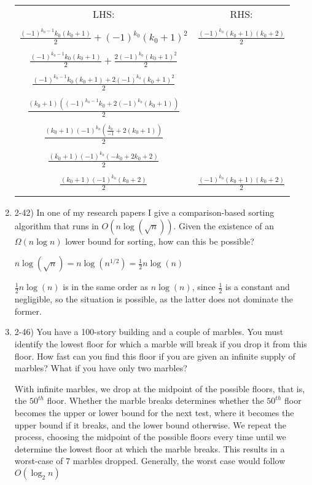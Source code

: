 \documentclass{article}
\begin{document}
\begin{enumerate}
    \begin{center}
        \begin{tabular}{ c | c } 
        LHS: & RHS: \\ \\
        $ \frac{(-1)^{k_0-1}k_0(k_0+1)}{2} + (-1)^{k_0}(k_0+1)^2 $ & $ \frac{(-1)^{k_0}(k_0+1)(k_0+2)}{2} $ \\ \\
        $ \frac{(-1)^{k_0-1}k_0(k_0+1)}{2} + \frac{2(-1)^{k_0}(k_0+1)^2}{2} $ &  \\ \\
        $ \frac{(-1)^{k_0-1}k_0(k_0+1) + 2(-1)^{k_0}(k_0+1)^2}{2}  $ &  \\ \\
        $ \frac{(k_0+1)((-1)^{k_0-1}k_0+2(-1)^{k_0}(k_0+1))}{2}  $ &  \\ \\
        $ \frac{(k_0+1)(-1)^{k_0}(\frac{k_0}{-1}+2(k_0+1))}{2}  $ &  \\ \\
        $ \frac{(k_0+1)(-1)^{k_0}(-k_0+2k_0+2)}{2}  $ &  \\ \\
        $ \boxed{\frac{(k_0+1)(-1)^{k_0}(k_0+2)}{2}}  $ &  $\boxed{\frac{(-1)^{k_0}(k_0+1)(k_0+2)}{2}}$\\ \\
        \end{tabular}
    \end{center}
    
    \item 2-42) In one of my research papers I give a comparison-based sorting algorithm that runs in $O(n \log(\sqrt{n}))$. Given the existence of an $\Omega(n \log n)$ lower bound for sorting, how can this be possible?
    
    \(n \log(\sqrt{n}) = n \log(n^{1/2}) = \frac{1}{2} n \log(n)\)

    \(\frac{1}{2} n \log(n) \) is in the same order as \(n \log(n)\), since \(\frac{1}{2}\) is a constant and negligible, so the situation is possible, as the latter does not dominate the former.
    
    \item 2-46) You have a 100-story building and a couple of marbles. You must identify the lowest floor for which a marble will break if you drop it from this floor. How fast can you find this floor if you are given an infinite supply of marbles? What if you have only two marbles?

    With infinite marbles, we drop at the midpoint of the possible floors, that is, the $50^{th}$ floor. Whether the marble breaks determines whether the $50^{th}$ floor becomes the upper or lower bound for the next test, where it becomes the upper bound if it breaks, and the lower bound otherwise. We repeat the process, choosing the midpoint of the possible floors every time until we determine the lowest floor at which the marble breaks. This results in a worst-case of 7 marbles dropped. Generally, the worst case would follow $O(\log_2 n)$


\end{enumerate}
\end{document}

